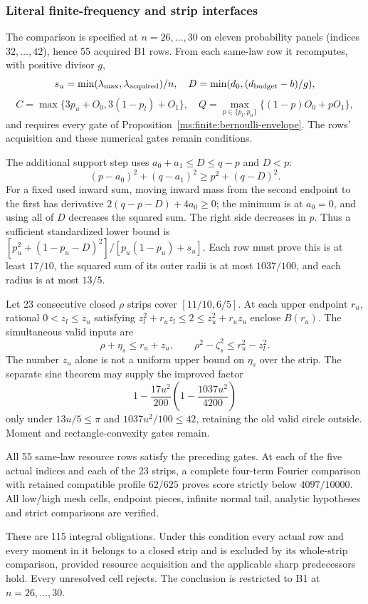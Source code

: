 \subsubsection{Literal finite-frequency and strip interfaces}
\label{ms:finite:sine-interface}
The comparison is specified at $n=26,\ldots,30$ on eleven probability
panels (indices $32,\ldots,42$), hence 55 acquired B1 rows. From each
same-law row it recomputes, with positive divisor $g$,
\[
 s_u=\min(\lambda_{\max},\lambda_{\rm acquired})/n,
 \quad D=\min(d_0,(d_{\rm budget}-b)/g),
\]
\[
 C=\max\{3p_u+O_0,3(1-p_l)+O_1\},\quad
 Q=\max_{p\in\{p_l,p_u\}}\{(1-p)O_0+pO_1\},
\]
and requires every gate of Proposition~\ref{ms:finite:bernoulli-envelope}.
The rows' acquisition and these numerical gates remain conditions.

The additional support step uses $a_0+a_1\le D\le q-p$ and $D<p$:
\[
 (p-a_0)^2+(q-a_1)^2\ge p^2+(q-D)^2.
\]
For a fixed used inward sum, moving inward mass from the second endpoint
to the first has derivative $2(q-p-D)+4a_0\ge0$; the minimum is
at $a_0=0$, and using all of $D$ decreases the squared sum.
The right side decreases in $p$. Thus a sufficient standardized lower
bound is $[p_u^2+(1-p_u-D)^2]/[p_u(1-p_u)+s_u]$.
Each row must prove this is at least $17/10$, the squared sum of its
outer radii is at most $1037/100$, and each radius is at most $13/5$.

Let 23 consecutive closed $\rho$ strips cover $[11/10,6/5]$. At each
upper endpoint $r_u$, rational $0<z_l\le z_u$ satisfying
$z_l^2+r_uz_l\le2\le z_u^2+r_uz_u$ enclose $B(r_u)$.
The simultaneous valid inputs are
\[
 \rho+\eta_s\le r_u+z_u,\qquad
 \rho^2-\zeta_s^2\le r_u^2-z_l^2.
\]
The number $z_u$ alone is not a uniform upper bound on $\eta_s$ over
the strip. The separate sine theorem may supply the improved factor
\[
 1-\frac{17u^2}{200}\left(1-\frac{1037u^2}{4200}\right)
\]
only under $13u/5\le\pi$ and $1037u^2/100\le42$, retaining the
old valid circle outside. Moment and rectangle-convexity gates remain.
\begin{condition}
\label{ms:finite:b1-cover}
All 55 same-law resource rows satisfy the preceding gates. At each of the
five actual indices and each of the 23 strips, a complete four-term Fourier
comparison with retained compatible profile $62/625$ proves score strictly
below $4097/10000$. All low/high mesh cells, endpoint pieces, infinite
normal tail, analytic hypotheses and strict comparisons are verified.
\end{condition}
There are 115 integral obligations. Under this condition every actual row
and every moment in it belongs to a closed strip and is excluded by its
whole-strip comparison, provided resource acquisition and the applicable
sharp predecessors hold. Every unresolved cell rejects. The conclusion is
restricted to B1 at $n=26,\ldots,30$.
